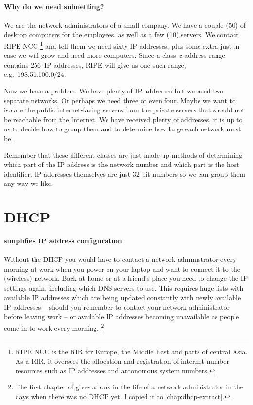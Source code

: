 \paragraph{Why do we need subnetting?}
We are the network administrators of a small company.
We have a couple (50) of desktop computers for the employees, as well as a few (10) servers.
We contact \acs{RIPE} \acs{NCC}%
    \footnote{\gls{RIPE} \gls{NCC} is the \gls{RIR} for Europe, the Middle East and parts of central Asia. As a \gls{RIR}, it oversees the allocation and registration of internet number resources such as \acs{IP} addresses and autonomous system numbers.}
and tell them we need sixty \acs{IP} addresses, plus some extra just in case we will grow and need more computers.
Since a class~c address range contains 256~\acs{IP} addresses, \gls{RIPE} will give us one such range, e.g.~198.51.100.0/24.%

Now we have a problem.
We have plenty of \acs{IP} addresses but we need two separate networks.
Or perhaps we need three or even four.
Maybe we want to isolate the public internet-facing servers from the private servers that should not be reachable from the Internet.
We have received plenty of addresses, it is up to us to decide how to group them and to determine how large each network must be.

Remember that these different classes are just made-up methods of determining which part of the \acs{IP} address is the network number and which part is the host identifier.
\acs{IP} addresses themselves are just 32-bit numbers so we can group them any way we like.


\section{\acl{DHCP}}
\label{sec:ip-dhcp}


\paragraph{simplifies \acs{IP} address configuration}
Without the \gls{DHCP} you would have to contact a network administrator every morning at work when you power on your laptop and want to connect it to the (wireless) network.
Back at home or at a friend's place you need to change the \acs{IP} settings again, including which \acs{DNS} servers to use.
This requires huge lists with available \acs{IP} addresses which are being updated constantly with newly available \acs{IP} addresses -- should you remember to contact your network administrator before leaving work -- or available \acs{IP} addresses becoming unavailable as people come in to work every morning.%
   \footnote{%
      The first chapter of \textcite[3-7]{droms} gives a look in the life of a network administrator in the days when there was no \acs{DHCP} yet.
      I copied it to \vref{chap:dhcp-extract}.
   }


